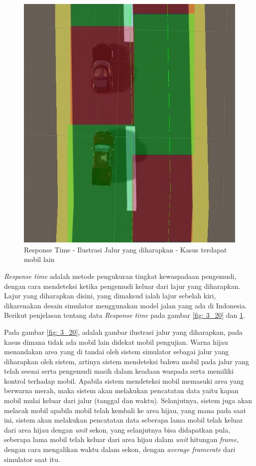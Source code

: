         \begin{figure}  [!htb]
	        \captionsetup{justification=centering}
	        \includegraphics[scale=0.6]{img/jalur-dgn-mobil.JPG}
	        \caption{Response Time - Ilustrasi Jalur yang diharapkan - Kasus terdapat mobil lain}
	        \label{fig: 3_21}
        \end{figure}
        
        \textit{Response time} adalah metode pengukuran tingkat kewaspadaan pengemudi, dengan cara mendeteksi ketika pengemudi keluar dari lajur yang diharapkan. Lajur yang diharapkan disini, yang dimaksud ialah lajur sebelah kiri, dikarenakan desain simulator menggunakan model jalan yang ada di Indonesia. Berikut penjelasan tentang data \textit{Response time} pada gambar \ref{fig: 3_20} dan \ref{fig: 3_21}.
        
        Pada gambar \ref{fig: 3_20}, adalah gambar ilustrasi jalur yang diharapkan, pada kasus dimana tidak ada mobil lain didekat mobil pengujian. Warna hijau menandakan area yang di tandai oleh sistem simulator sebagai jalur yang diharapkan oleh sistem, artinya sistem mendeteksi bahwa mobil pada jalur yang telah sesuai serta pengemudi masih dalam keadaan waspada serta memiliki kontrol terhadap mobil. Apabila sistem mendeteksi mobil memasuki area yang berwarna merah, maka sistem akan melakukan pencatatan data yaitu kapan mobil mulai keluar dari jalur (tanggal dan waktu). Selanjutnya, sistem juga akan melacak mobil apabila mobil telah kembali ke area hijau, yang mana pada saat ini, sistem akan melakukan pencatatan data seberapa lama mobil telah keluar dari area hijau dengan \textit{unit} sekon, yang selanjutnya bisa didapatkan pula, seberapa lama mobil telah keluar dari area hijau dalam \textit{unit} hitungan \textit{frame}, dengan cara mengalikan waktu dalam sekon, dengan \textit{average framerate} dari simulator saat itu.
        
